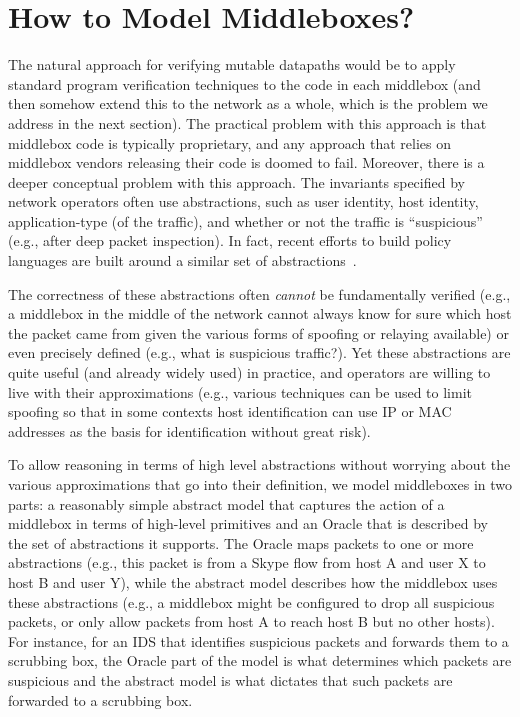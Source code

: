 \section{How to Model Middleboxes?}
\label{sec:mbmodel}
The natural approach for verifying mutable datapaths would be to apply standard program verification techniques to the code in each middlebox (and then somehow extend this to the network as a whole, which is the problem we address in the next section). The practical problem with this approach is that middlebox code is typically proprietary, and any approach that relies on middlebox vendors releasing their code is doomed to fail.
Moreover, there is a deeper conceptual problem with this approach. The invariants specified by network operators often use abstractions, such as user identity, host identity, application-type (of the traffic), and whether or not the traffic is ``suspicious'' (e.g., after deep packet inspection). In fact, recent efforts to build policy languages are built around a similar set of abstractions~\cite{congress}.

The correctness of these abstractions often {\em cannot} be fundamentally verified (e.g., a middlebox in the middle of the network cannot always know for sure which host the packet came from given the various forms of spoofing or relaying available) or even precisely defined (e.g., what is suspicious traffic?). Yet these abstractions are quite useful (and already widely used) in practice, and operators are willing to live with their approximations (e.g., various techniques can be used to limit spoofing so that in some contexts host identification can use IP or MAC addresses as the basis for identification without great risk).

To allow reasoning in terms of high level abstractions without worrying about the various approximations that go into their definition, we model middleboxes in two parts: a reasonably simple abstract model that captures the action of a middlebox in terms of high-level primitives and an Oracle that is described by the set of abstractions it supports. The Oracle maps packets to one or more abstractions (e.g., this packet is from a Skype flow from host A and user X to host B and user Y), while the abstract model describes how the middlebox uses these abstractions (e.g., a middlebox might be configured to drop all suspicious packets, or only allow packets from host A to reach host B but no other hosts). For instance, for an IDS that identifies suspicious packets and forwards them to a scrubbing box, the Oracle part of the model is what determines which packets are suspicious and the abstract model is what dictates that such packets are forwarded to a scrubbing box.

